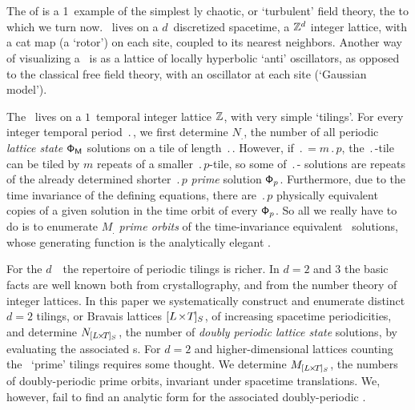 
\section{\catLatt} %
\label{s:catlatt}


The \emph{\templatt} of   is a 1\dmn\ example of the simplest
{\spt}ly chaotic, or `turbulent' field theory, the {\em \catlatt} to
which we turn now. \catLatt\ lives on a  $d$\dmn\ discretized spacetime,
a {\spt} $\mathbb{Z}^d$ integer lattice, with a cat map (a `rotor') on
each site, coupled to its nearest neighbors. Another way of visualizing a
\catlatt\ is as a lattice of locally hyperbolic `anti' oscillators, as
opposed to the classical free field theory, with an oscillator at each
site (`Gaussian model').

The \templatt\ lives on a $1$\dmn\ temporal integer lattice $\mathbb{Z}$,
with very  simple `tilings'. For every integer temporal period
$\period{}$, we first determine $N_\period{}$, the number of all periodic
\emph{lattice state} ${\mathsf{\Phi}}_{\mathsf{M}}$ solutions on a tile of length
$\period{}$. However, if $\period{}=m\period{p}$, the $\period{}$-tile
can be tiled by $m$ repeats of a smaller  $\period{p}$-tile, so {some} of
$\period{}$-{\po} {solutions} are repeats of the already determined
shorter $\period{p}$ \emph{prime} solution  $\mathsf{\Phi}_p$. Furthermore, due to
the time invariance of the defining equations, there are $\period{p}$
physically equivalent copies of a given solution in the time orbit of
every $\mathsf{\Phi}_p$. So all we really have to do is to enumerate $M_\period{}$
{\em prime orbits} of the time-invariance equivalent \po\ solutions,
whose generating function is the analytically elegant {\tzeta}.

For the $d$\dmn\ \catlatt\ the repertoire of periodic tilings is richer.
In $d=2$ and $3$ the basic facts are well known both from
crystallography, and from the number theory of integer lattices. In this
paper we systematically construct and enumerate distinct $d=2$ tilings,
or Bravais lattices ${[{L_{}}\!\times\!{T_{}}]_{S_{}}}$, of increasing spacetime periodicities,
and determine $N_{{[{L_{}}\!\times\!{T_{}}]_{S_{}}}}$, the number of \emph{doubly periodic
lattice state} solutions, by evaluating the associated {\HillDet}s.
For $d=2$ and higher-dimensional lattices
counting the \spt\ `prime' tilings requires some thought. We
determine $M_{{[{L_{}}\!\times\!{T_{}}]_{S_{}}}}$, the numbers of
doubly-periodic prime orbits, invariant under spacetime translations.
We, however, fail to find an analytic form for the associated
doubly-periodic {\tzeta}.

